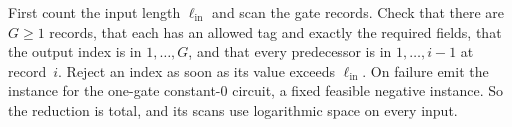 First count the input length $\ell_{\mathrm{in}}$ and scan the gate
records. Check that there are $G\ge1$ records, that each has an allowed tag
and exactly the required fields, that the output index is in
$1,\ldots,G$, and that every predecessor is in $1,\ldots,i-1$ at
record~$i$. Reject an index as soon as its value exceeds
$\ell_{\mathrm{in}}$. On failure emit the instance for the one-gate
constant-$0$ circuit, a fixed feasible negative instance. So the reduction
is total, and its scans use logarithmic space on every input.

